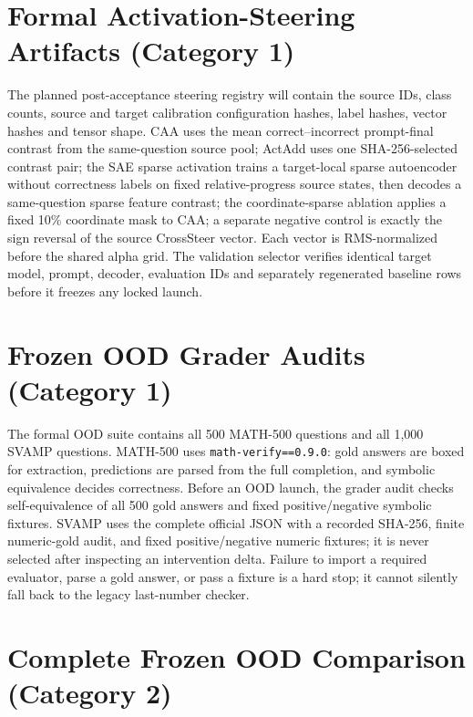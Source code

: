 \section{Formal Activation-Steering Artifacts (Category 1)}
\label{app:steering-artifacts}

The planned post-acceptance steering registry will contain the source IDs, class counts, source and
target calibration configuration hashes, label hashes, vector hashes and tensor
shape.  CAA uses the mean correct--incorrect prompt-final contrast from the
same-question source pool; ActAdd uses one SHA-256-selected contrast pair; the
SAE sparse activation trains a target-local sparse autoencoder without correctness labels on fixed relative-progress source states, then decodes a same-question sparse feature contrast; the coordinate-sparse ablation applies a fixed 10\% coordinate mask to CAA; a separate negative control is exactly the sign reversal of the source CrossSteer vector.  Each vector is
RMS-normalized before the shared alpha grid.  The validation selector verifies
identical target model, prompt, decoder, evaluation IDs and separately regenerated
baseline rows before it freezes any locked launch.

\section{Frozen OOD Grader Audits (Category 1)}
\label{app:math500-grader}

The formal OOD suite contains all 500 MATH-500 questions and all 1,000 SVAMP
questions. MATH-500 uses \texttt{math-verify==0.9.0}: gold answers are boxed for
extraction, predictions are parsed from the full completion, and symbolic
equivalence decides correctness. Before an OOD launch, the grader audit checks
self-equivalence of all 500 gold answers and fixed positive/negative symbolic
fixtures. SVAMP uses the complete official JSON with a recorded SHA-256, finite
numeric-gold audit, and fixed positive/negative numeric fixtures; it is never
selected after inspecting an intervention delta. Failure to import a required
evaluator, parse a gold answer, or pass a fixture is a hard stop; it cannot
silently fall back to the legacy last-number checker.
\section{Complete Frozen OOD Comparison (Category 2)}
\label{app:ood-results}

